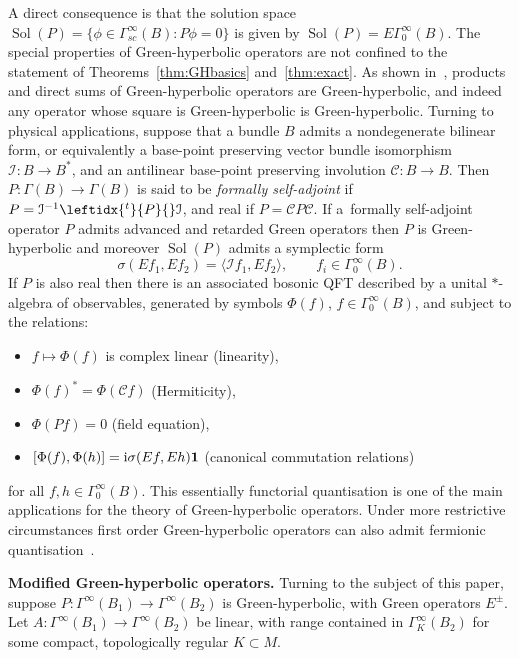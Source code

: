 \documentclass[pdftex]{sigma}
\numberwithin{equation}{section}
\newcommand{\II}{{\boldsymbol{1}}}
\newcommand{\GoinX}[1]{\Gamma_0^\infty({#1})}
\DeclareMathOperator{\Sol}{Sol}
\newcommand{\adj}[1]{\leftidx{^{t}}{#1}{}}
\begin{document}
 A direct consequence is that the solution space $\Sol(P)=\{\phi\in\Gamma^\infty_{sc}(B)\colon P\phi=0\}$ is given by
 $\Sol(P)=E\GoinX{B}$.
 The special properties of Green-hyperbolic operators are not confined to the statement of Theorems~\ref{thm:GHbasics} and~\ref{thm:exact}. As shown in~\cite{Baer:2015}, products and direct sums of Green-hyperbolic operators are Green-hyperbolic, and indeed any operator whose square is Green-hyperbolic is Green-hyperbolic.
 Turning to physical applications, suppose that a bundle $B$ admits a nondegenerate bilinear form, or equivalently a base-point preserving vector bundle isomorphism $\mathcal{I}\colon B\to B^*$, and an antilinear base-point preserving involution $\mathcal{C}\colon B\to B$. Then $P\colon \Gamma(B)\to\Gamma(B)$ is said to be \emph{formally self-adjoint} if $P= \mathcal{I}^{-1}\adj{P}\mathcal{I}$, and real if $P=\mathcal{C} P \mathcal{C}$.
 If a~formally self-adjoint operator $P$ admits advanced and retarded Green operators then $P$ is Green-hyperbolic and moreover $\Sol(P)$ admits a symplectic form
 \begin{equation*}
 	\sigma(Ef_1,Ef_2) = \langle \mathcal{I} f_1,Ef_2\rangle, \qquad f_i\in\GoinX{B} .
 \end{equation*}
 If $P$ is also real then there is an associated bosonic QFT described by a unital $*$-algebra of observables, generated by symbols $\Phi(f)$, $f\in\Gamma_0^\infty(B)$, and subject to the relations:
 \begin{itemize}\itemsep=0pt
 	\item $f\mapsto\Phi(f)$ is complex linear (linearity),
 	\item $\Phi(f)^* = \Phi(\mathcal{C} f)$ (Hermiticity),
 	\item $\Phi(Pf)=0$ (field equation),
 	\item $[\Phi(f),\Phi(h)]={\rm i}\sigma(Ef,E h) \II$ (canonical commutation relations)
 \end{itemize}
 for all $f,h\in \Gamma_0^\infty(B)$. This essentially functorial quantisation is one of the main applications for the theory of Green-hyperbolic operators. Under more restrictive circumstances first order Green-hyperbolic operators can also admit fermionic quantisation~\cite{BaerGinoux:2012}.


 {\bf Modified Green-hyperbolic operators.}
 Turning to the subject of this paper, suppose $P\colon \Gamma^\infty(B_1)\to \Gamma^\infty(B_2)$ is Green-hyperbolic, with Green operators $E^\pm$. Let $A\colon\Gamma^\infty(B_1)\to \Gamma^\infty(B_2)$ be linear, with range contained in $\Gamma^\infty_K(B_2)$ for some compact, topologically regular $K\subset M$.
\end{document}
